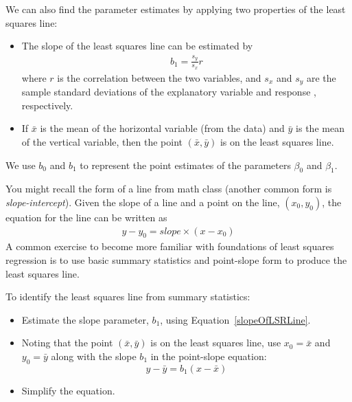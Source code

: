We can also find the parameter estimates by applying two properties of the least squares line:
\begin{itemize}
\item The slope of the least squares line can be estimated by
\begin{eqnarray}
b_1 = \frac{s_y}{s_x} r
\label{slopeOfLSRLine}
\end{eqnarray}
where $r$ is the correlation between the two variables, and $s_x$ and $s_y$ are the sample standard deviations of the explanatory variable %
and response%
, respectively.
\item If $\bar{x}$ is the mean of the horizontal variable (from the data) and $\bar{y}$ is the mean of the vertical variable, then the point $(\bar{x}, \bar{y})$ is on the least squares line.
\end{itemize}
We use $b_0$ and $b_1$ to represent the point estimates of the parameters $\beta_0$ and $\beta_1$.

You might recall the  form of a line from math class (another common form is \emph{slope-intercept}). Given the slope of a line and a point on the line, $(x_0, y_0)$, the equation for the line can be written as
\begin{eqnarray}
y - y_0 = slope\times (x - x_0)
\label{pointSlopeFormForALine}
\end{eqnarray}
A common exercise to become more familiar with foundations of least squares regression is to use basic summary statistics and point-slope form to produce the least squares line. 

\begin{tipBox}{
To identify the least squares line from summary statistics:\vspace{-1mm}
\begin{itemize}
\setlength{\itemsep}{0mm}
\item Estimate the slope parameter, $b_1$, using Equation~\eqref{slopeOfLSRLine}.
\item Noting that the point $(\bar{x}, \bar{y})$ is on the least squares line, use $x_0=\bar{x}$ and $y_0=\bar{y}$ along with the slope $b_1$ in the point-slope equation:
$$y - \bar{y} = b_1 (x - \bar{x}) $$
\item Simplify the equation.\vspace{0.5mm}
\end{itemize}}
\end{tipBox}


